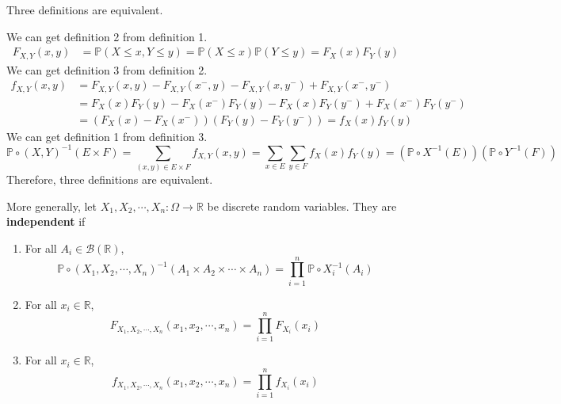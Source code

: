 \documentclass{huhtakm-template-book}
\newcommand{\prob}{\mathbb{P}}
\begin{document}
    \newpage
    \begin{cla}
        Three definitions are equivalent.
    \end{cla}
    \begin{proofing}
        We can get definition 2 from definition 1.
        \begin{align*}
            F_{X,Y}(x,y)&=\prob(X\leq x,Y\leq y)=\prob(X\leq x)\prob(Y\leq y)=F_{X}(x)F_{Y}(y)
        \end{align*}
        We can get definition 3 from definition 2.
        \begin{align*}
            f_{X,Y}(x,y)&=F_{X,Y}(x,y)-F_{X,Y}(x^{-},y)-F_{X,Y}(x,y^{-})+F_{X,Y}(x^{-},y^{-})\\
            &=F_{X}(x)F_{Y}(y)-F_{X}(x^{-})F_{Y}(y)-F_{X}(x)F_{Y}(y^{-})+F_{X}(x^{-})F_{Y}(y^{-})\\
            &=(F_{X}(x)-F_{X}(x^{-}))(F_{Y}(y)-F_{Y}(y^{-}))=f_{X}(x)f_{Y}(y)
        \end{align*}
        We can get definition 1 from definition 3.
        \begin{equation*}
            \prob\circ(X,Y)^{-1}(E\times F)=\sum_{(x,y)\in E\times F}f_{X,Y}(x,y)=\sum_{x\in E}\sum_{y\in F}f_{X}(x)f_{Y}(y)=(\prob\circ X^{-1}(E))(\prob\circ Y^{-1}(F))
        \end{equation*}
        Therefore, three definitions are equivalent.
    \end{proofing}
    \begin{rem}
        More generally, let $X_{1},X_{2},\cdots,X_{n}:\Omega\to\mathbb{R}$ be discrete random variables. They are \textbf{independent} if
        \begin{enumerate}
            \item For all $A_{i}\in\mathcal{B}(\mathbb{R})$,
            \begin{equation*}
                \prob\circ(X_{1},X_{2},\cdots,X_{n})^{-1}(A_{1}\times A_{2}\times\cdots\times A_{n})=\prod_{i=1}^{n}\prob\circ X_{i}^{-1}(A_{i})
            \end{equation*}
            \item For all $x_{i}\in\mathbb{R}$,
            \begin{equation*}
                F_{X_{1},X_{2},\cdots,X_{n}}(x_{1},x_{2},\cdots,x_{n})=\prod_{i=1}^{n}F_{X_{i}}(x_{i})
            \end{equation*}
            \item For all $x_{i}\in\mathbb{R}$,
            \begin{equation*}
                f_{X_{1},X_{2},\cdots,X_{n}}(x_{1},x_{2},\cdots,x_{n})=\prod_{i=1}^{n}f_{X_{i}}(x_{i})
            \end{equation*}
        \end{enumerate}
    \end{rem}
\end{document}
